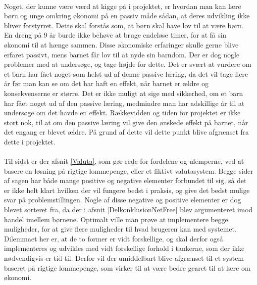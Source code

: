 \\
Noget, der kunne være værd at kigge på i projektet, er hvordan man kan lære børn og unge omkring økonomi på en passiv måde sådan, at deres udvikling ikke bliver forstyrret. Dette skal forstås som, at børn skal have lov til at være børn. En dreng på 9 år burde ikke behøve at bruge endeløse timer, for at få sin økonomi til at hænge sammen. Disse økonomiske erfaringer skulle gerne blive erfaret passivt, mens barnet får lov til at nyde sin barndom. Der er dog nogle problemer med at undersøge, og tage højde for dette. Det er svært at vurdere om et barn har fået noget som helst ud af denne passive læring, da det vil tage flere år før man kan se om det har haft en effekt, når barnet er ældre og konsekvenserne er større. Det er ikke muligt at sige med sikkerhed, om et barn har fået noget ud af den passive læring, medmindre man har adskillige år til at undersøge om det havde en effekt. Rækkevidden og tiden for projektet er ikke stort nok, til at om den passive læring vil give den ønskede effekt på barnet, når det engang er blevet ældre. På grund af dette vil dette punkt blive afgrænset fra dette i projektet.\\
\\
Til sidst er der afsnit \ref{Valuta}, som gør rede for fordelene og ulemperne, ved at basere en løsning på rigtige lommepenge, eller et fiktivt valutasystem. Begge sider af sagen har både mange positive og negative elementer forbundet til sig, så det er ikke helt klart hvilken der vil fungere bedst i praksis, og give det bedst mulige svar på problemstillingen. Nogle af disse negative og positive elementer er dog blevet sorteret fra, da der i afsnit \ref{DelkonklusionNetFree} blev argumenteret imod handel imellem børnene. Optimalt ville man prøve at implementere begge muligheder, for at give flere muligheder til hvad brugeren kan med systemet. Dilemmaet her er, at de to former er vidt forskellige, og skal derfor også implementeres og udvikles med vidt forskellige forhold i tankerne, som der ikke nødvendigvis er tid til. Derfor vil der umiddelbart blive afgrænset til et system baseret på rigtige lommepenge, som virker til at være bedre gearet til at lære om økonomi.
